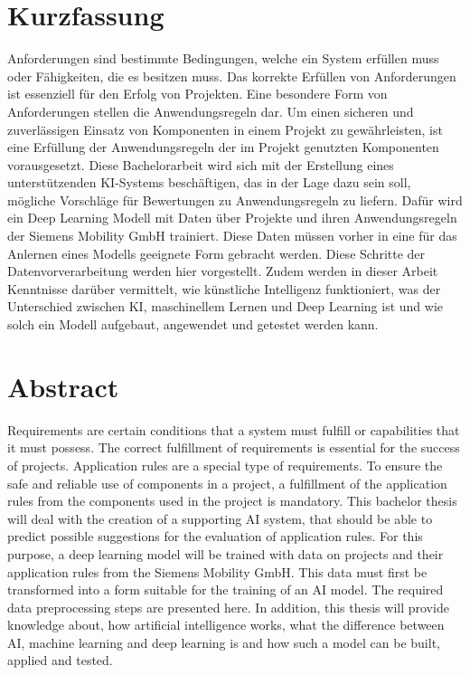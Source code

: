 \section*{Kurzfassung}
Anforderungen sind bestimmte Bedingungen, welche ein System erfüllen muss oder Fähigkeiten, die es besitzen muss. Das korrekte Erfüllen von Anforderungen ist essenziell für den Erfolg von Projekten.
Eine besondere Form von Anforderungen stellen die Anwendungsregeln dar. Um einen sicheren und zuverlässigen Einsatz von Komponenten in einem Projekt zu gewährleisten,
ist eine Erfüllung der Anwendungsregeln der im Projekt genutzten Komponenten vorausgesetzt. Diese Bachelorarbeit wird sich mit der Erstellung eines unterstützenden KI-Systems beschäftigen,
das in der Lage dazu sein soll, mögliche Vorschläge für Bewertungen zu Anwendungsregeln zu liefern. Dafür wird ein Deep Learning Modell mit Daten über Projekte und 
ihren Anwendungsregeln der Siemens Mobility GmbH trainiert. Diese Daten müssen vorher in eine für das Anlernen eines Modells geeignete Form 
gebracht werden. Diese Schritte der Datenvorverarbeitung werden hier vorgestellt. Zudem werden in dieser Arbeit Kenntnisse darüber vermittelt, 
wie künstliche Intelligenz funktioniert, was der Unterschied zwischen KI, maschinellem Lernen und Deep Learning ist und wie solch ein Modell aufgebaut, angewendet und getestet werden kann. 

\vfill\vfill\vfill\vfill\vfill\vfill
\section*{Abstract}
Requirements are certain conditions that a system must fulfill or capabilities that it must possess. The correct fulfillment of requirements is essential for the success of projects.
Application rules are a special type of requirements. To ensure the safe and reliable use of components in a project,
a fulfillment of the application rules from the components used in the project is mandatory. This bachelor thesis will deal with the creation of a supporting AI system,
that should be able to predict possible suggestions for the evaluation of application rules. For this purpose, a deep learning model will be trained with data on projects and 
their application rules from the Siemens Mobility GmbH. This data must first be transformed into a form suitable for the training of an AI model. 
The required data preprocessing steps are presented here. In addition, this thesis will provide knowledge about, 
how artificial intelligence works, what the difference between AI, machine learning and deep learning is and how such a model can be built, applied and tested.
\vfill\vfill\vfill\vfill\vfill\vfill